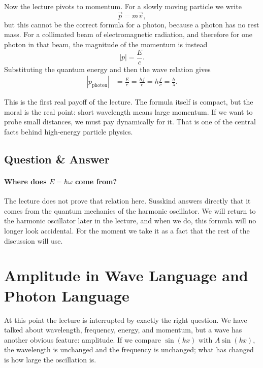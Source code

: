 Now the lecture pivots to momentum. For a slowly moving particle we write
\begin{equation}
\vec p = m\vec v,
\end{equation}
but this cannot be the correct formula for a photon, because a photon has no rest mass. For a collimated beam of electromagnetic radiation, and therefore for one photon in that beam, the magnitude of the momentum is instead
\begin{equation}
|p|=\frac{E}{c}.
\end{equation}
Substituting the quantum energy and then the wave relation gives
\begin{align}
|p_{\text{photon}}|
   &= \frac{E}{c}
    = \frac{hf}{c}
    = h\frac{f}{c}
    = \frac{h}{\lambda}.
\end{align}

This is the first real payoff of the lecture. The formula itself is compact, but the moral is the real point: short wavelength means large momentum. If we want to probe small distances, we must pay dynamically for it. That is one of the central facts behind high-energy particle physics.

\subsection{Question \& Answer}
\paragraph{Where does \(E=\hbar\omega\) come from?}
The lecture does not prove that relation here. Susskind answers directly that it comes from the quantum mechanics of the harmonic oscillator. We will return to the harmonic oscillator later in the lecture, and when we do, this formula will no longer look accidental. For the moment we take it as a fact that the rest of the discussion will use.

\section{Amplitude in Wave Language and Photon Language}

At this point the lecture is interrupted by exactly the right question. We have talked about wavelength, frequency, energy, and momentum, but a wave has another obvious feature: amplitude. If we compare \(\sin(kx)\) with \(A\sin(kx)\), the wavelength is unchanged and the frequency is unchanged; what has changed is how large the oscillation is.

